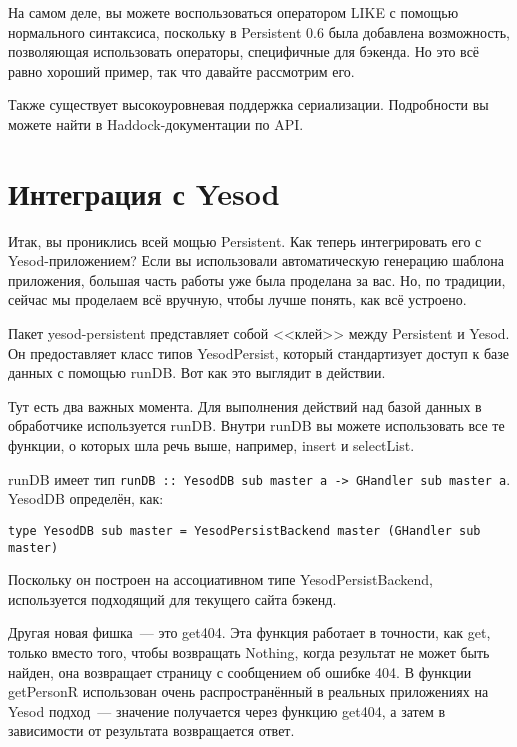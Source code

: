 \begin{remark}
На самом деле, вы можете воспользоваться оператором LIKE с помощью нормального синтаксиса, поскольку в Persistent 0.6 была добавлена возможность, позволяющая использовать операторы, специфичные для бэкенда. Но это всё равно хороший пример, так что давайте рассмотрим его.
\end{remark}


Также существует высокоуровневая поддержка сериализации. Подробности вы можете найти в Haddock-документации по API.

\section{Интеграция с Yesod} %

Итак, вы прониклись всей мощью Persistent. Как теперь интегрировать его с Yesod-приложением? Если вы использовали автоматическую генерацию шаблона приложения, большая часть работы уже была проделана за вас. Но, по традиции, сейчас мы проделаем всё вручную, чтобы лучше понять, как всё устроено.

Пакет yesod-persistent представляет собой <<клей>> между Persistent и Yesod. Он предоставляет класс типов YesodPersist, который стандартизует доступ к базе данных с помощью runDB. Вот как это выглядит в действии.


Тут есть два важных момента. Для выполнения действий над базой данных в обработчике используется runDB. Внутри runDB вы можете использовать все те функции, о которых шла речь выше, например, insert и selectList. 

\begin{remark}
runDB имеет тип \lstinline'runDB :: YesodDB sub master a -> GHandler sub master a'. YesodDB определён, как:

\begin{lstlisting}
type YesodDB sub master = YesodPersistBackend master (GHandler sub master)
\end{lstlisting}

Поскольку он построен на ассоциативном типе YesodPersistBackend, используется подходящий для текущего сайта бэкенд.
\end{remark}

Другая новая фишка~--- это get404. Эта функция работает в точности, как get, только вместо того, чтобы возвращать Nothing, когда результат не может быть найден, она возвращает страницу с сообщением об ошибке 404. В функции getPersonR использован очень распространённый в реальных приложениях на Yesod подход~--- значение получается через функцию get404, а затем в зависимости от результата возвращается ответ.

